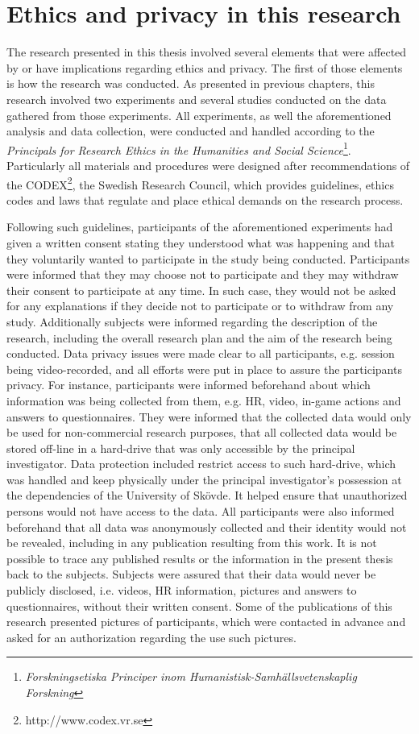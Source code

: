 \section{Ethics and privacy in this research}
\label{sec:ethics-this-research}

The research presented in this thesis involved several elements that were affected by or have implications regarding ethics and privacy. The first of those elements is how the research was conducted. As presented in previous chapters, this research involved two experiments and several studies conducted on the data gathered from those experiments. All experiments, as well the aforementioned analysis and data collection, were conducted and handled according to the \textit{Principals for Research Ethics in the Humanities and Social Science}\footnote{\textit{Forskningsetiska Principer inom Humanistisk-Samhällsvetenskaplig Forskning}}. Particularly all materials and procedures were designed after recommendations of the CODEX\footnote{http://www.codex.vr.se}, the Swedish Research Council, which provides guidelines, ethics codes and laws that regulate and place ethical demands on the research process.

Following such guidelines, participants of the aforementioned experiments had given a written consent stating they understood what was happening and that they voluntarily wanted to participate in the study being conducted. Participants were informed that they may choose not to participate and they may withdraw their consent to participate at any time. In such case, they would not be asked for any explanations if they decide not to participate or to withdraw from any study. Additionally subjects were informed regarding the description of the research, including the overall research plan and the aim of the research being conducted. Data privacy issues were made clear to all participants, e.g. session being video-recorded, and all efforts were put in place to assure the participants privacy. For instance, participants were informed beforehand about which information was being collected from them, e.g. HR, video, in-game actions and answers to questionnaires. They were informed that the collected data would only be used for non-commercial research purposes, that all collected data would be stored off-line in a hard-drive that was only accessible by the principal investigator. Data protection included restrict access to such hard-drive, which was handled and keep physically under the principal investigator's possession at the dependencies of the University of Sk\"ovde. It helped ensure that unauthorized persons would not have access to the data. All participants were also informed beforehand that all data was anonymously collected and their identity would not be revealed, including in any publication resulting from this work. It is not possible to trace any published results or the information in the present thesis back to the subjects. Subjects were assured that their data would never be publicly disclosed, i.e. videos, HR information, pictures and answers to questionnaires, without their written consent. Some of the publications of this research presented pictures of participants, which were contacted in advance and asked for an authorization regarding the use such pictures.


